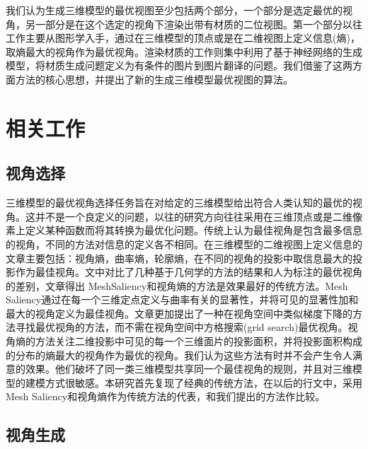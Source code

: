 \documentclass[UTF8,openany,AutoFakeBold,AutoFakeSlant,cs4size]{ctexbook}
\begin{document}
我们认为生成三维模型的最优视图至少包括两个部分，一个部分是选定最优的视角，另一部分是在这个选定的视角下渲染出带有材质的二位视图。第一个部分以往工作主要从图形学入手，通过在三维模型的顶点或是在二维视图上定义信息(熵)，取熵最大的视角作为最优视角。渲染材质的工作则集中利用了基于神经网络的生成模型，将材质生成问题定义为有条件的图片到图片翻译的问题。我们借鉴了这两方面方法的核心思想，并提出了新的生成三维模型最优视图的算法。

\section{相关工作}

\subsection{视角选择}

三维模型的最优视角选择任务旨在对给定的三维模型给出符合人类认知的最优的视角。这并不是一个良定义的问题，以往的研究方向往往采用在三维顶点或是二维像素上定义某种函数而将其转换为最优化问题。传统上认为最佳视角是包含最多信息的视角，不同的方法对信息的定义各不相同。在三维模型的二维视图上定义信息的文章主要包括：视角熵\cite{Vzquez2003AutomaticVS}，曲率熵\cite{Page2003ShapeAA}，轮廓熵\cite{Page2003ShapeAA}，在不同的视角的投影中取信息最大的投影作为最佳视角。\cite{Dutagaci2010ABF}文中对比了几种基于几何学的方法的结果和人为标注的最优视角的差别，文章得出 MeshSaliency\cite{Lee2005MeshS}和视角熵\cite{Vzquez2003AutomaticVS}的方法是效果最好的传统方法。Mesh Saliency\cite{Lee2005MeshS}通过在每一个三维定点定义与曲率有关的显著性，并将可见的显著性加和最大的视角定义为最佳视角。文章更加提出了一种在视角空间中类似梯度下降的方法寻找最优视角的方法，而不需在视角空间中方格搜索(grid search)最优视角。视角熵\cite{Vzquez2003AutomaticVS}的方法关注二维投影中可见的每一个三维面片的投影面积，并将投影面积构成的分布的熵最大的视角作为最优的视角。我们认为这些方法有时并不会产生令人满意的效果。他们破坏了同一类三维模型共享同一个最佳视角的规则，并且对三维模型的建模方式很敏感。本研究首先复现了经典的传统方法，在以后的行文中，采用Mesh Saliency和视角熵作为传统方法的代表，和我们提出的方法作比较。

\subsection{视角生成}
\end{document}
